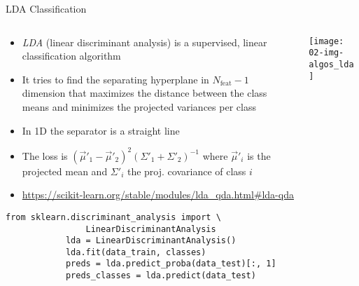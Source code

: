   \begin{frame}[fragile]{LDA Classification}
    \begin{columns}
      \begin{column}{0.65\textwidth}
        \begin{itemize}
          \item \emph{LDA} (linear discriminant analysis) is a supervised, linear classification algorithm
          \item It tries to find the separating hyperplane in $N_\text{feat} - 1$ dimension that maximizes the distance between the class means and minimizes the projected variances per class
          \item In 1D the separator is a straight line
          \item The loss is
            $(\vec{\mu}'_1 - \vec{\mu}'_2)^2(\Sigma'_1 + \Sigma'_2)^{-1}$
            where $\vec{\mu}'_i$ is the projected mean and $\Sigma'_i$ the proj. covariance of class $i$
          \item \small\url{https://scikit-learn.org/stable/modules/lda_qda.html#lda-qda}
        \end{itemize}
        \begin{mdframed}
          \begin{lstlisting}[style=dark, gobble=10, title=\lsttitlelight{LDA classification [Note: example shortened]}]
            from sklearn.discriminant_analysis import \
                LinearDiscriminantAnalysis
            lda = LinearDiscriminantAnalysis()
            lda.fit(data_train, classes)
            preds = lda.predict_proba(data_test)[:, 1]
            preds_classes = lda.predict(data_test)
          \end{lstlisting}
        \end{mdframed}
      \end{column}
      \begin{column}{0.35\textwidth}
        \vspace{1em}

        \texttt{[image: 02-img-algos\_lda]}
      \end{column}
    \end{columns}
  \end{frame}

